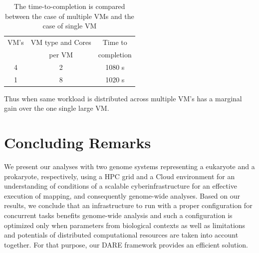 \documentclass{acm_proc_article-sp}
\begin{document}
 \begin{table}
 \begin{tabular}{|c|c|c|} 
 \hline 
VM's & VM type and Cores  & Time to  \\ 
&per VM& completion\\ 
\hline
4 &  2 & 1080 s \\
1 & 8 & 1020 s \\
 \hline 
 \end{tabular}
 \label{table:cloud-VM} 
 \caption{The time-to-completion is compared between the case of multiple VMs and the case of single VM}
\end{table}

Thus when same workload is distributed across multiple VM's has a
marginal gain over the one single large VM.



\section{Concluding Remarks}
We present our analyses with two genome systems representing a
eukaryote and a prokaryote, respectively, using a HPC grid and a Cloud
environment for an understanding of conditions of a scalable
cyberinfrastructure for an effective execution of mapping, and
consequently genome-wide analyses.  Based on our results, we conclude
that an infrastructure to run with a proper configuration for
concurrent tasks benefits genome-wide analysis and such a
configuration is optimized only when parameters from biological
contexts as well as limitations and potentials of distributed
computational resources are taken into account together.  For that
purpose, our DARE framework provides an efficient solution.





\end{document}
